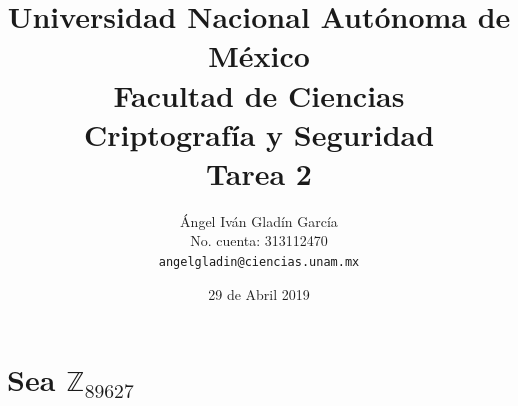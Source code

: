 \documentclass[11pt,letterpaper]{article}
\newcommand{\Z}{\mathbb{Z}}
\begin{document}
\title{
    \vspace{-2cm}
        Universidad Nacional Autónoma de México\\
        Facultad de Ciencias\\
        Criptografía y Seguridad\\
    \vspace{.5cm}
    \large
        \textbf{Tarea 2}\\        
}
\author{
    Ángel Iván Gladín García\\
    No. cuenta: 313112470\\
    \texttt{angelgladin@ciencias.unam.mx}
}
\date{29 de Abril 2019}
\maketitle

\newtheorem{theorem}{Teorema}
\newtheorem{example}{Ejemplo}
\newtheorem{corollary}{Corolario}
\newtheorem{lemma}{Lemma}
\newtheorem{definition}{Definición}
\newtheorem{prop}{Proposición}



\section{Sea $\Z_{89627}$}
\end{document}
